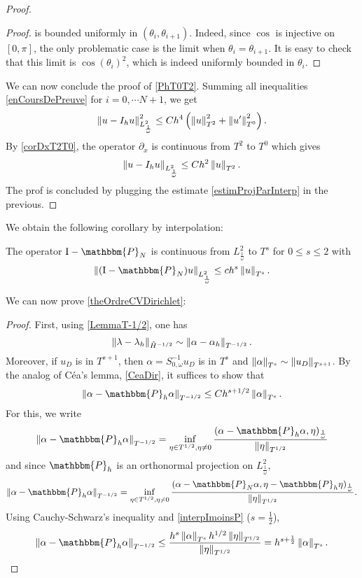 \documentclass[a4paper]{article}
\begin{document}
\begin{proof}
\begin{proof}
		is bounded uniformly in $(\theta_i, \theta_{i+1})$. Indeed, since $\cos$ is injective on $[0,\pi]$, the only problematic case is the limit when $\theta_i = \theta_{i+1}$. It is easy to check that this limit is $\cos(\theta_i)^2$, which is indeed uniformly bounded in $\theta_i$. 	
	\end{proof}
	\noindent We can now conclude the proof of \autoref{PhT0T2}. Summing all inequalities \eqref{enCoursDePreuve} for $i = 0, \cdots N+1$, we get 
	\[\left\|u - I_h u\right\|_{L^2_\frac{1}{\omega}}^2 \leq Ch^4 \left( \left\|u\right\|_{T^2}^2 + \left\|u'\right\|_{T^0}^2\right).\]
	By \autoref{corDxT2T0}, the operator $\partial_x$ is continuous from $T^2$ to $T^0$ which gives 
	\[\left\|u - I_hu\right\|_{L^2_\frac{1}{\omega}} \leq Ch^2 \left\|u\right\|_{T^2}.\]
	The prof is concluded by plugging the estimate \eqref{estimProjParInterp} in the previous. 
\end{proof}
\noindent We obtain the following corollary by interpolation:
\begin{Cor}
	\label{interpImoinsP}
	The operator $\textup{I} - \mathbbm{P}_N$ is continuous from $L^2_\frac{1}{\omega}$ to $T^s$ for $0 \leq s \leq 2$ with
	\[\norm{(\textup{I} - \mathbbm{P}_N)u}_{L^2_\frac{1}{\omega}} \leq c h^s \norm{u}_{T^s}.\]
\end{Cor}
\noindent We can now prove \autoref{theOrdreCVDirichlet}:
\begin{proof}
	First, using \autoref{LemmaT-1/2}, one has 
	\[\left\|\lambda - \lambda_h\right\|_{\tilde{H}^{-1/2}} \sim \left\|\alpha - \alpha_h\right\|_{T^{-1/2}}.\]
	Moreover, if $u_D$ is in $T^{s+1}$, then $\alpha = S_{0,\omega}^{-1} u_D$ is in $T^s$ and $\left\|\alpha\right\|_{T^s} \sim \left\|u_D\right\|_{T^{s+1}}$. 	
	By the analog of Céa's lemma, \autoref{CeaDir}, it suffices to show that 
	\[ \norm{\alpha - \mathbbm{P}_h \alpha}_{T^{-1/2}} \leq C h^{s + 1/2} \norm{\alpha}_{T^s}.\]
	For this, we write
	\[\norm{\alpha - \mathbbm{P}_h \alpha}_{T^{-1/2}} = \inf_{\eta \in T^{1/2}, \eta \neq 0} \dfrac{(\alpha - \mathbbm{P}_h \alpha,\eta)_{\frac{1}{\omega}}}{\norm{\eta}_{T^{1/2}}}\]
	and since $\mathbbm{P}_h$ is an orthonormal projection on $L^2_\frac{1}{\omega}$, 
	\[\norm{\alpha - \mathbbm{P}_h \alpha}_{T^{-1/2}} = \inf_{\eta \in T^{1/2}, \eta \neq 0} \dfrac{(\alpha - \mathbbm{P}_N \alpha,\eta -\mathbbm{P}_h \eta )_{\frac{1}{\omega}}}{\norm{\eta}_{T^{1/2}}}.\]
	Using Cauchy-Schwarz's inequality and \autoref{interpImoinsP} ($s = \frac{1}{2}$), 
	\[\norm{\alpha - \mathbbm{P}_h \alpha}_{T^{-1/2}} \leq \dfrac{h^s \norm{\alpha}_{T^s} h^{1/2}\norm{\eta}_{T^{1/2}}}{\norm{\eta}_{T^{1/2}}} = h^{s+\frac{1}{2}} \norm{\alpha}_{T^s}.\]
\end{proof}
\end{document}
